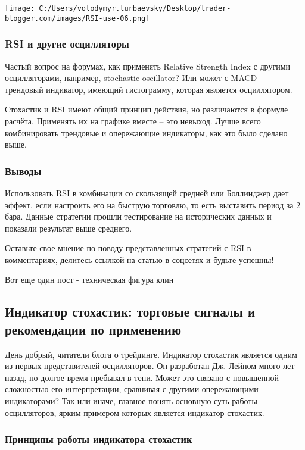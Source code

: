 \documentclass[a5paper]{article}
\begin{document}
\texttt{[image: C:/Users/volodymyr.turbaevsky/Desktop/trader-blogger.com/images/RSI-use-06.png]}

\subsubsection{RSI и другие осцилляторы}

Частый вопрос на форумах, как применять Relative Strength Index с другими осцилляторами, например, stochastic oscillator? Или может с MACD – трендовый индикатор, имеющий гистограмму, которая является осциллятором.

Стохастик и RSI имеют общий принцип действия, но различаются в формуле
расчёта. Применять их на графике вместе – это невыход. Лучше всего
комбинировать трендовые и опережающие индикаторы, как это было сделано
выше.

\subsubsection{Выводы}

Использовать RSI в комбинации со скользящей средней или Боллинджер дает эффект, если настроить его на быструю торговлю, то есть выставить период за 2 бара. Данные стратегии прошли тестирование на исторических данных и показали результат выше среднего.

Оставьте свое мнение по поводу представленных стратегий с RSI в комментариях, делитесь ссылкой на статью в соцсетях и будьте успешны!


Вот еще один пост - техническая фигура клин

\subsection{Индикатор стохастик: торговые сигналы и рекомендации по
  применению}

День добрый, читатели блога о трейдинге. Индикатор стохастик является одним из первых представителей осцилляторов. Он разработан Дж. Лейном много лет назад, но долгое время пребывал в тени. Может это связано с повышенной сложностью его интерпретации, сравнивая с другими опережающими индикаторами? Так или иначе, главное понять основную суть работы осцилляторов, ярким примером которых является индикатор стохастик.

\subsubsection{Принципы работы индикатора стохастик}
\end{document}
